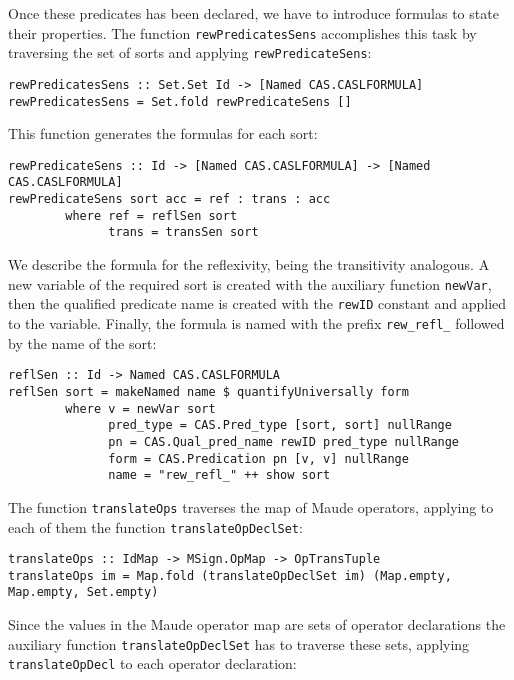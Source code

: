 Once these predicates has been declared, we have to introduce
formulas to state their properties. The function \verb"rewPredicatesSens"
accomplishes this task by traversing the set of sorts and applying
\verb"rewPredicateSens":

{\codesize
\begin{verbatim}
rewPredicatesSens :: Set.Set Id -> [Named CAS.CASLFORMULA]
rewPredicatesSens = Set.fold rewPredicateSens []
\end{verbatim}
}

This function generates the formulas for each sort:

{\codesize
\begin{verbatim}
rewPredicateSens :: Id -> [Named CAS.CASLFORMULA] -> [Named CAS.CASLFORMULA]
rewPredicateSens sort acc = ref : trans : acc
        where ref = reflSen sort
              trans = transSen sort
\end{verbatim}
}

We describe the formula for the reflexivity, being the transitivity
analogous. A new variable of the required sort is created with
the auxiliary function \verb"newVar", then the qualified predicate
name is created with the \verb"rewID" constant and applied to the
variable. Finally, the formula is named with the prefix \verb"rew_refl_"
followed by the name of the sort:

{\codesize
\begin{verbatim}
reflSen :: Id -> Named CAS.CASLFORMULA
reflSen sort = makeNamed name $ quantifyUniversally form
        where v = newVar sort
              pred_type = CAS.Pred_type [sort, sort] nullRange
              pn = CAS.Qual_pred_name rewID pred_type nullRange
              form = CAS.Predication pn [v, v] nullRange
              name = "rew_refl_" ++ show sort
\end{verbatim}
}

The function \verb"translateOps" traverses the map of Maude operators,
applying to each of them the function \verb"translateOpDeclSet":

{\codesize
\begin{verbatim}
translateOps :: IdMap -> MSign.OpMap -> OpTransTuple
translateOps im = Map.fold (translateOpDeclSet im) (Map.empty, Map.empty, Set.empty)
\end{verbatim}
}

Since the values in the Maude operator map are sets of operator declarations
the auxiliary function \verb"translateOpDeclSet" has to traverse these sets, applying
\verb"translateOpDecl" to each operator declaration:

